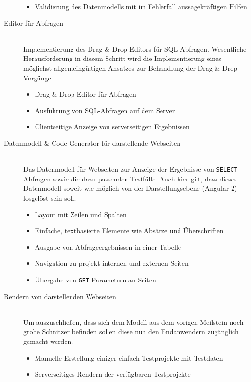 \begin{description}
\begin{itemize}[noitemsep]
  \item Validierung des Datenmodells mit im Fehlerfall aussagekräftigen Hilfen
  \end{itemize}
\item [Editor für Abfragen] \hfill \\
  Implementierung des Drag \& Drop Editors für SQL-Abfragen. Wesentliche Herausforderung in diesem Schritt wird die Implementierung eines möglichst allgemeingültigen Ansatzes zur Behandlung der Drag \& Drop Vorgänge.
  \begin{itemize}[noitemsep]
  \item Drag \& Drop Editor für Abfragen
  \item Ausführung von SQL-Abfragen auf dem Server
  \item Clientseitige Anzeige von serverseitigen Ergebnissen
  \end{itemize}
\item [Datenmodell \& Code-Generator für darstellende Webseiten] \hfill \\
  Das Datenmodell für Webseiten zur Anzeige der Ergebnisse von \texttt{SELECT}-Abfragen sowie die dazu passenden Testfälle. Auch hier gilt, dass dieses Datenmodell soweit wie möglich von der Darstellungsebene (Angular 2) losgelöst sein soll.
  \begin{itemize}[noitemsep]
  \item Layout mit Zeilen und Spalten
  \item Einfache, textbasierte Elemente wie Absätze und Überschriften
  \item Ausgabe von Abfrageergebnissen in einer Tabelle
  \item Navigation zu projekt-internen und externen Seiten
  \item Übergabe von \texttt{GET}-Parametern an Seiten
  \end{itemize}

\item [Rendern von darstellenden Webseiten] \hfill \\
  Um auszuschließen, dass sich dem Modell aus dem vorigen Meilstein noch grobe Schnitzer befinden sollen diese nun den Endanwendern zugänglich gemacht werden.
  \begin{itemize}[noitemsep]
  \item Manuelle Erstellung einiger einfach Testprojekte mit Testdaten
  \item Serverseitiges Rendern der verfügbaren Testprojekte
  \end{itemize}
  

\end{description}
